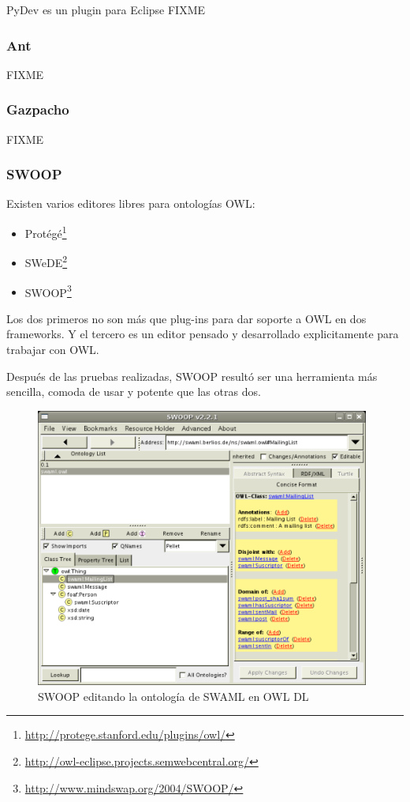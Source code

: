 PyDev es un plugin para Eclipse FIXME

\subsubsection{Ant}

FIXME

\subsubsection{Gazpacho}

FIXME

\subsubsection{SWOOP}

Existen varios editores libres para ontologías OWL:

\begin{itemize}
  \item Protégé\footnote{\url{http://protege.stanford.edu/plugins/owl/}}
  \item SWeDE\footnote{\url{http://owl-eclipse.projects.semwebcentral.org/}}
  \item SWOOP\footnote{\url{http://www.mindswap.org/2004/SWOOP/}}
\end{itemize}

Los dos primeros no son más que plug-ins para dar soporte a OWL en dos 
frameworks. Y el tercero es un editor pensado y desarrollado explicitamente
para trabajar con OWL.

Después de las pruebas realizadas, SWOOP resultó ser una herramienta más sencilla,
comoda de usar y potente que las otras dos.

\begin{figure}[ht]
	\centering
	\includegraphics[width=11cm]{images/swoop.png}
	\caption{SWOOP editando la ontología de SWAML en OWL DL}
	\label{fig:evoWeb}
\end{figure}

